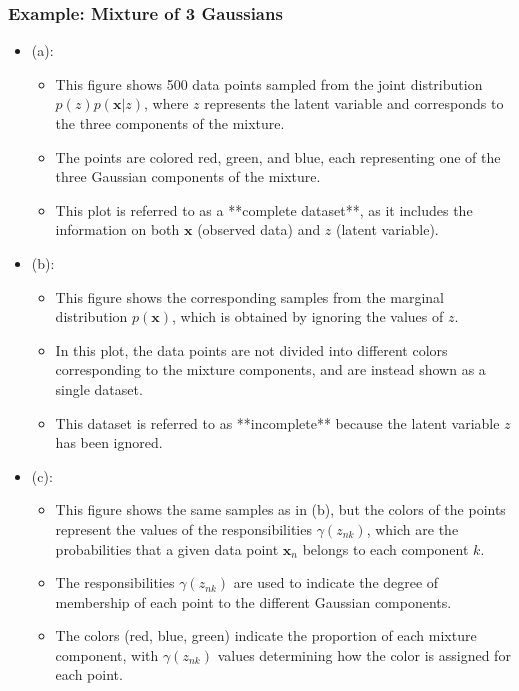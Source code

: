 \subsubsection{Example: Mixture of 3 Gaussians}
\begin{example}
    \begin{itemize}
        \item (a):
        \begin{itemize}
            \item This figure shows 500 data points sampled from the joint distribution \( p(z) p(\mathbf{x} | z) \), where \( z \) represents the latent variable and corresponds to the three components of the mixture.
            \item The points are colored red, green, and blue, each representing one of the three Gaussian components of the mixture.
            \item This plot is referred to as a **complete dataset**, as it includes the information on both \( \mathbf{x} \) (observed data) and \( z \) (latent variable).
        \end{itemize}
    
        \item (b):
        \begin{itemize}
            \item This figure shows the corresponding samples from the marginal distribution \( p(\mathbf{x}) \), which is obtained by ignoring the values of \( z \).
            \item In this plot, the data points are not divided into different colors corresponding to the mixture components, and are instead shown as a single dataset.
            \item This dataset is referred to as **incomplete** because the latent variable \( z \) has been ignored.
        \end{itemize}
    
        \item (c):
        \begin{itemize}
            \item This figure shows the same samples as in (b), but the colors of the points represent the values of the responsibilities \( \gamma(z_{nk}) \), which are the probabilities that a given data point \( \mathbf{x}_n \) belongs to each component \( k \).
            \item The responsibilities \( \gamma(z_{nk}) \) are used to indicate the degree of membership of each point to the different Gaussian components.
            \item The colors (red, blue, green) indicate the proportion of each mixture component, with \( \gamma(z_{nk}) \) values determining how the color is assigned for each point.
        \end{itemize}
    \end{itemize}
\end{example}

